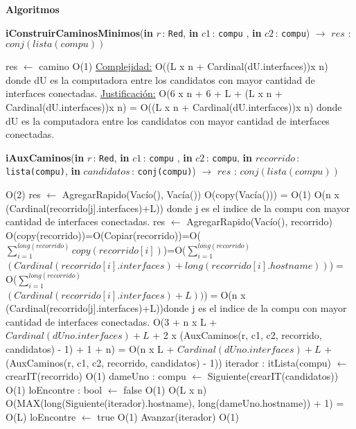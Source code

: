 \documentclass[a4paper,10pt]{article}
\let\TipoVariable=\texttt
\let\ModificadorArgumento=\textbf
\newcommand{\In}[2]{\ModificadorArgumento{in} \ensuremath{#1}\,: \TipoVariable{#2}\xspace}
\newenvironment{Algoritmos}{%
  \vspace*{2ex}%
  \noindent\textbf{\Large Algoritmos}%
  \vspace*{2ex}%
}{}
\begin{document}
\begin{Algoritmos}
\begin{algorithm}[H]{\textbf{iConstruirCaminosMinimos}(\In {r}{Red}, \In {c1}{compu} , \In {c2}{compu}) $\to$ $res$ : $conj(lista(compu))$}
\begin{algorithmic}
	\EndWhile
	\State res $\gets$ camino  	\Comment O(1)
			\medskip
			\Statex \underline{Complejidad:} O((L x n + Cardinal(dU.interfaces))x n) donde dU es la computadora entre los candidatos con mayor cantidad de interfaces conectadas.
			\Statex \underline{Justificación:} O(6 x n + 6 + L + (L x n + Cardinal(dU.interfaces))x n) = O((L x n + Cardinal(dU.interfaces))x n) donde dU es la computadora entre los candidatos con mayor cantidad de interfaces conectadas.
    	\end{algorithmic}
\end{algorithm}
\begin{algorithm}[H]{\textbf{iAuxCaminos}(\In {r}{Red}, \In {c1}{compu} , \In {c2}{compu}, \In {recorrido}{lista(compu)}, \In {candidatos}{conj(compu)}) $\to$ $res$ : $conj(lista(compu))$} 
	\begin{algorithmic}
			 	\Comment O(2)
			  \State res $\gets$ AgregarRapido(Vac\'io(), Vac\'ia())  \Comment O(copy(Vac\'ia())) = O(1)
			 	        \Comment O(n x (Cardinal(recorrido[j].interfaces)+L)) donde j es el indice de la compu con mayor cantidad de interfaces conectadas. 
			    \State res $\gets$ AgregarRapido(Vac\'io(), recorrido) 	\Comment O(copy(recorrido))=O(Copiar(recorrido))=O($\sum_{i=1}^{long(recorrido)}copy(recorrido[i])$)=O($\sum_{i=1}^{long(recorrido)}$ \\$(Cardinal(recorrido[i].interfaces) + long(recorrido[i].hostname))$)$=$O($\sum_{i=1}^{long(recorrido)}$ \\$(Cardinal(recorrido[i].interfaces) + L))$)$=$O(n x (Cardinal(recorrido[j].interfaces)+L))donde j es el indice de la compu con mayor cantidad de interfaces conectadas.
			  \Else  						\Comment O(3 + n x L + $Cardinal(dUno.interfaces)+L$ + 2 x (AuxCaminos(r, c1, c2, recorrido, candidatos) - 1) + 1 + n) = O(n x L + $Cardinal(dUno.interfaces)+L$ + (AuxCaminos(r, c1, c2, recorrido, candidatos) - 1))
			      \State iterador : itLista(compu) $\gets$ crearIT(recorrido)   	\Comment O(1)
			      \State dameUno : compu $\gets$ Siguiente(crearIT(candidatos))     \Comment O(1)
			      \State loEncontre : bool $\gets$ false 				\Comment O(1)
			         \Comment O(L x n)
				   \Comment O(MAX(long(Siguiente(iterador).hostname), long(dameUno.hostname)) + 1) = O(L)
				  \State loEncontre $\gets$ true 			\Comment O(1)
				\EndIf
				\State Avanzar(iterador) 				\Comment O(1)
			      \EndWhile
			      

\end{algorithmic}
\end{algorithm}
\end{Algoritmos}
\end{document}
